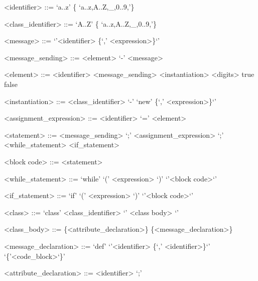 \documentclass{eplDoc}
\begin{document}
\maketitle
\newpage

\begin{grammar}
<identifier> ::= `a..z' \{ `a..z,A..Z,\_,0..9,'\} 

<class\_identifier> ::= `A..Z' \{ `a..z,A..Z,\_,0..9,'\} 

<message> ::= `{'<identifier> \{`,' <expression>\}`}'

<message\_sending> ::= <element> `\<-' <message>

<element> ::= <identifier> 
\alt<message\_sending>
\alt<instantiation>
\alt<digits>
\alt true \alt false


<instantiation> ::= <class\_identifier> `\<-' `{new' \{`,' <expression>\}`}'


<assignment\_expression> ::= <identifier> `=' <element>

<statement> ::= <message_sending> `;'
\alt <assignment\_expression>
 `;'
\alt <while\_statement>
\alt <if\_statement>

<block code> ::= { <statement> }

<while\_statement> ::= `while' `(' <expression> `)'  `{'<block code>`}'

<if\_statement> ::= `if' `(' <expression> `)'  `{'<block code>`}'




<class> ::= `class' <class\_identifier> `{' <class body> `}'

<class\_body> ::= \{<attribute\_declaration>\} \{<message\_declaration>\}

<message\_declaration> ::= `def'  `{'<identifier> \{`,' <identifier>\}`}' `\{'<code\_block>`\}'

<attribute\_declaration> ::= <identifier> `;'









\end{grammar}
\end{document}
